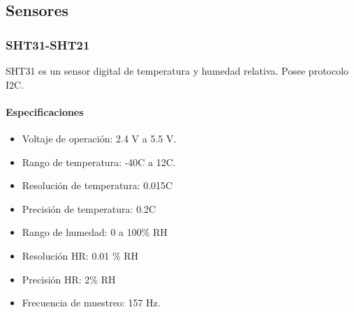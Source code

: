 
\subsection{Sensores}
	\subsubsection{SHT31-SHT21}
	\begin{tcolorbox}[colback=blue!5!white,colframe=blue!75!black,title=Definición]
		SHT31 es un sensor digital de temperatura y humedad relativa. Posee protocolo I2C.\end{tcolorbox}
	
	\paragraph*{Especificaciones}

	\begin{minipage}[t]{.7\textwidth}
		\begin{itemize}
			\item   Voltaje de operación: 2.4 V a 5.5 V.
			\item	Rango de temperatura: -40\grad C a 12\grad C.
			\item   Resolución de temperatura: 0.015\grad C
			\item	Precisión de temperatura: 0.2\grad C 
			\item	Rango de humedad: 0 a 100\% RH
			\item   Resolución HR: 0.01 \% RH
			\item   Precisión HR: 2\% RH
			\item Frecuencia de muestreo: 157 Hz.
		\end{itemize}
	\end{minipage}	
	\begin{minipage}[t]{.3\textwidth}
		\centering{}
		\label{fig:SHT31}
	\end{minipage}

